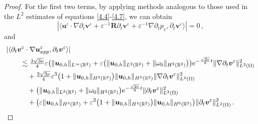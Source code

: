 \documentclass[10pt,a4paper]{amsart}
\begin{document}
\begin{proof}
	
	For the first two terms, by applying methods analogous to those used in the $L^2$ estimates of equations \eqref{4.4}-\eqref{4.7}, we can obtain
	\begin{equation}\label{3.2.1}
		|\langle{\boldsymbol u}^{\varepsilon} \cdot \nabla \partial_t{\boldsymbol v}^{\varepsilon}
		+	{\varepsilon}^{-1}\boldsymbol{R}
		\partial_t\boldsymbol v^{\varepsilon}
		+		{\varepsilon}^{-1}\nabla \partial_t p_v,\partial_t{\boldsymbol v}^{\varepsilon}\rangle|=0\,,
	\end{equation}
	and
	\begin{align}\label{3.3.1}
		&|\langle
		\partial_t{\boldsymbol v}^{\varepsilon}\cdot
		\nabla\boldsymbol{u}^{\varepsilon}_{app},
		\partial_t{\boldsymbol v}^{\varepsilon}
		\rangle|\notag\\
		&\qquad\lesssim
		\tfrac{3\sqrt{3\nu}}{4}
		\varepsilon
		\big(
		\lVert{\boldsymbol{u}}_{0,h}\rVert_{L^\infty(\mathbb{R}^2)} 
		+\varepsilon\big(
		\lVert{\boldsymbol{u}}_{0,h}\rVert_{L^2(\mathbb{R}^2)}+\lVert{\omega}_0\rVert_{H^2(\mathbb{R}^2)}
		\big)
		\big)\mathrm{e}^{-\frac{\sqrt{2\nu}}{8}  t}
		\lVert\nabla\partial_t{\boldsymbol v}^{\varepsilon}\rVert^2_{{L}^2(\Omega)}
		\notag\\
		&\qquad\quad+\tfrac{3\sqrt{3\nu}}{4}\varepsilon^3
		\big(
		1+
		\lVert {\boldsymbol{u}}_{0,h} \rVert_{H^{3}(\mathbb{R}^2)}
		\big)
		\lVert {\boldsymbol{u}}_{0,h} \rVert_{H^{5}(\mathbb{R}^2)}
		\lVert\nabla\partial_t{\boldsymbol v}^{\varepsilon}\rVert^2_{{L}^2(\Omega)}\notag\\
		&\qquad\quad+
		\big(
		\lVert{\boldsymbol{u}}_{0,h}\rVert_{L^2(\mathbb{R}^2)}+\lVert{\omega}_0\rVert_{H^2(\mathbb{R}^2)}
		\big)\mathrm{e}^{-\frac{\sqrt{2\nu}}{8}  t}\lVert \partial_t{\boldsymbol v}^{\varepsilon} \rVert^2_{{L}^2(\Omega)}
		\notag\\
		&\qquad\quad+\big(\varepsilon
		\lVert {\boldsymbol{u}}_{0,h} \rVert_{H^{4}(\mathbb{R}^2)}
		+\varepsilon^2
		\big(
		1+
		\lVert {\boldsymbol{u}}_{0,h} \rVert_{H^{4}(\mathbb{R}^2)}
		\big)
		\lVert {\boldsymbol{u}}_{0,h} \rVert_{H^{6}(\mathbb{R}^2)}\big)\lVert\partial_t {\boldsymbol v}^{\varepsilon} \rVert^2_{{L}^2(\Omega)}\,.
	\end{align}
	

\end{proof}
\end{document}
